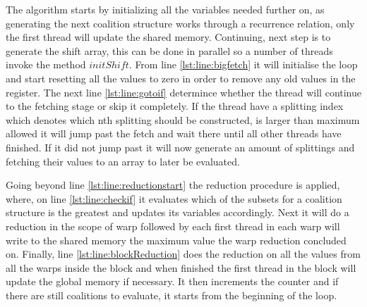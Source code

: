 \documentclass{llncs}
\begin{document}
The algorithm starts by initializing all the variables needed further on, as generating the next coalition structure works through a recurrence relation,  only the first thread will update the shared memory. Continuing, next step is to generate the shift array,  this can be done in parallel so a number of threads invoke the method $initShift$. From line \ref{lst:line:bigfetch} it will initialise the loop and start resetting all the values to zero  in order to remove any old values in the register. The next line \ref{lst:line:gotoif} determince whether the thread will continue to the fetching stage or skip it completely. If the thread have a splitting index which denotes which nth splitting should be constructed,  is larger than maximum allowed it will jump past the fetch and wait there until all other threads have finished. If it did not jump past it will now generate an amount of splittings and fetching their values to an array to later be evaluated.

Going beyond line \ref{lst:line:reductionstart} the reduction procedure is applied, where,  
on line \ref{lst:line:checkif} it evaluates which of the subsets for a coalition structure is the greatest and updates its variables accordingly. Next it will do a reduction in the scope of warp followed by each first thread in each warp will write to the shared memory  the maximum value the warp reduction concluded on. Finally, line \ref{lst:line:blockReduction} does the reduction on all the values
from all the warps inside the block and when finished the first thread in the block will update the global memory if necessary. It then increments the counter and if there are still coalitions to evaluate, it starts from the beginning of the loop.
\end{document}
